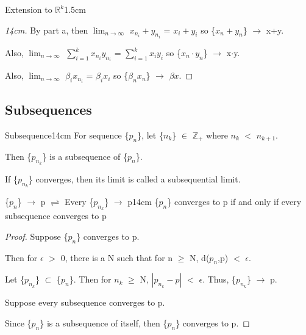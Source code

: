 \begin{ltheorem}{Extension to $\mathbb{R}^k$}{1.5cm}
            \begin{proof}[14cm]
                By part a, then
                $\lim_{n \rightarrow \infty}$ $x_{n_i} + y_{n_i}$
                = $x_i + y_i$ so
                \{$x_n + y_n$\} $\rightarrow$ x+y.

                Also,
                $\lim_{n \rightarrow \infty}$ $\sum_{i=1}^k x_{n_i} y_{n_i}$
                = $\sum_{i=1}^k x_i y_i$ so
                \{$x_n \cdot y_n$\} $\rightarrow$ x$\cdot$y.

                Also,
                $\lim_{n \rightarrow \infty}$ $\beta_i x_{n_i}$
                = $\beta_i x_i$ so
                \{$\beta_n x_n$\} $\rightarrow$ $\beta x$.
            \end{proof}
    \end{ltheorem}

    \vspace{0.5cm}





\subsection{ Subsequences }

    \begin{definition}{Subsequence}{14cm}
        For sequence \{$p_n$\}, let \{$n_k$\} $\in$ $\mathbb{Z}_+$
        where $n_k$ $<$ $n_{k+1}$.

        Then \{$p_{n_k}$\} is a subsequence of \{$p_n$\}.
        
        If \{$p_{n_k}$\} converges, then its limit is called
        a subsequential limit.
    \end{definition}
    
    \vspace{0.5cm}



    \begin{wtheorem}{\{$p_n$\} $\rightarrow$ p $\rightleftharpoons$
    Every \{$p_{n_k}$\} $\rightarrow$ p}{14cm}
        \{$p_n$\} converges to p if and only if every subsequence
        converges to p
    \end{wtheorem}
    
    \begin{proof}
        Suppose \{$p_n$\} converges to p.

        Then for $\epsilon$ $>$ 0, there is a N such that for n $\geq$ N,
        d($p_n$,p) $<$ $\epsilon$.

        Let \{$p_{n_k}$\} $\subset$ \{$p_n$\}.
        Then for $n_k$ $\geq$ N, $|p_{n_k} - p|$ $<$ $\epsilon$.
        Thus, \{$p_{n_k}$\} $\rightarrow$ p.

        \vspace{0.2cm}

        Suppose every subsequence converges to p.

        Since \{$p_n$\} is a subsequence of itself, then
        \{$p_n$\} converges to p.
    \end{proof}



